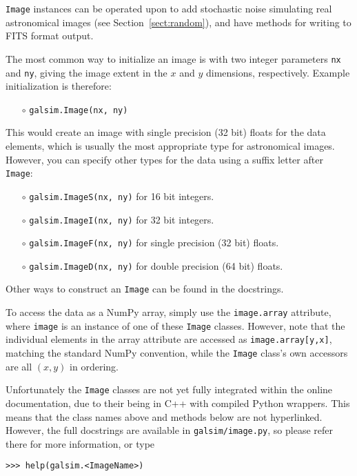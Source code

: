 \documentclass[preprint,11pt]{../../devel/modules/aastex}
\begin{document}
\texttt{Image} instances can be operated upon to add stochastic noise
simulating real astronomical images (see Section~\ref{sect:random}),
and have methods for writing to FITS format output.

The most common way to initialize an
image is with two integer parameters \texttt{nx} and \texttt{ny},
giving the image extent in the $x$ and $y$ dimensions, respectively.
Example initialization is therefore:
\begin{itemize}
\item[$\circ$] \texttt{galsim.Image(nx, ny)}
\end{itemize}
This would create an image with single precision (32 bit) floats for the data elements, which
is usually the most appropriate type for astronomical images.  However, you can specify
other types for the data using a suffix letter after \texttt{Image}:
\begin{itemize}
\item[$\circ$] \texttt{galsim.ImageS(nx, ny)} {for 16 bit integers.}

\item[$\circ$] \texttt{galsim.ImageI(nx, ny)} {for 32 bit integers.}

\item[$\circ$] \texttt{galsim.ImageF(nx, ny)} {for single precision (32 bit) floats.}

\item[$\circ$] \texttt{galsim.ImageD(nx, ny)} {for double precision (64 bit) floats.}
\end{itemize}
Other ways to construct an \texttt{Image} can be found in the docstrings.

To access the data as a NumPy array, simply use the \texttt{image.array}
attribute, where \texttt{image} is an instance of one of these
\texttt{Image} classes.  However, note that the individual elements in
the array attribute are accessed as \texttt{image.array[y,x]}, matching
the standard NumPy convention, while the \texttt{Image} class's own
accessors are all $(x,y)$ in ordering.

Unfortunately the \texttt{Image} classes are not yet fully integrated
within the online documentation, due to their being in C++ with
compiled Python wrappers.  This means that the class names above and
methods below are not hyperlinked.  However, the full docstrings are
available in \texttt{galsim/image.py}, so please refer there for more
information, or type

{\tt >>> help(galsim.<ImageName>)}
\end{document}
